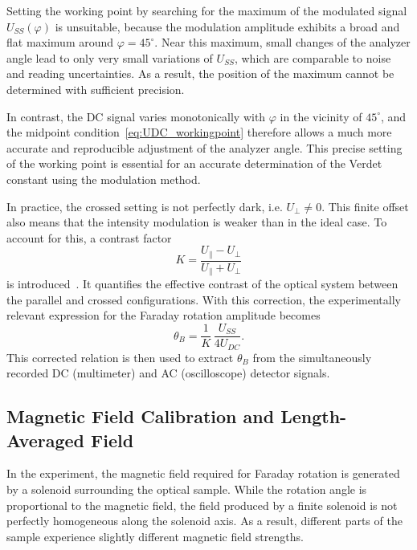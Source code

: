 \documentclass[a4paper]{article}
\begin{document}
Setting the working point by searching for the maximum of the modulated signal $U_{SS}(\varphi)$ is unsuitable, because the modulation amplitude exhibits a broad and flat maximum around $\varphi = 45^\circ$.
Near this maximum, small changes of the analyzer angle lead to only very small variations of $U_{SS}$, which are comparable to noise and reading uncertainties.
As a result, the position of the maximum cannot be determined with sufficient precision.

In contrast, the DC signal varies monotonically with $\varphi$ in the vicinity of $45^\circ$, and the midpoint condition~\eqref{eq:UDC_workingpoint} therefore allows a much more accurate and reproducible adjustment of the analyzer angle.
This precise setting of the working point is essential for an accurate determination of the Verdet constant using the modulation method.

In practice, the crossed setting is not perfectly dark, i.e. $U_{\perp}\neq 0$.
This finite offset also means that the intensity modulation is weaker than in the ideal case.
To account for this, a contrast factor
\begin{equation}
  K = \frac{U_{\parallel} - U_{\perp}}{U_{\parallel} + U_{\perp}}
  \label{eq:contrast_factor}
\end{equation}
is introduced~\cite{FARAnleitung}.
It quantifies the effective contrast of the optical system between the parallel and crossed configurations.
With this correction, the experimentally relevant expression for the Faraday rotation amplitude becomes
\begin{equation}
  \theta_B = \frac{1}{K}\,\frac{U_{SS}}{4 U_{DC}}.
  \label{eq:rotation_corrected}
\end{equation}
This corrected relation is then used to extract $\theta_B$ from the simultaneously recorded DC (multimeter) and AC (oscilloscope) detector signals.

\subsection{Magnetic Field Calibration and Length-Averaged Field}

In the experiment, the magnetic field required for Faraday rotation is generated by a solenoid surrounding the optical sample.
While the rotation angle is proportional to the magnetic field, the field produced by a finite solenoid is not perfectly homogeneous along the solenoid axis.
As a result, different parts of the sample experience slightly different magnetic field strengths.
\end{document}
